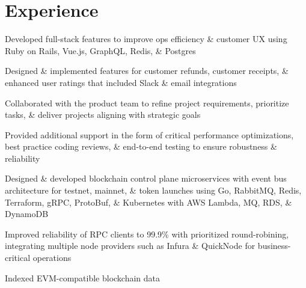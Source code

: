 \documentclass[]{resume}
\begin{document}
\begin{minipage}[t]{0.55\textwidth} 


\section{Experience}

\smallbreak
\smallbreak
\smallbreak
\begin{tightemize}
\item Developed full-stack features to improve ops efficiency \& customer UX using Ruby on Rails, Vue.js, GraphQL, Redis, \& Postgres
\item Designed \& implemented features for customer refunds, customer receipts, \& enhanced user ratings that included Slack \& email integrations
\item Collaborated with the product team to refine project requirements, prioritize tasks, \& deliver projects aligning with strategic goals
\item Provided additional support in the form of critical performance optimizations, best practice coding reviews, \& end-to-end testing to ensure robustness \& reliability
\end{tightemize}
\sectionsep 


\begin{tightemize}
\item Designed \& developed blockchain control plane microservices with event bus architecture for testnet, mainnet, \& token launches using Go, RabbitMQ, Redis, Terraform, gRPC, ProtoBuf, \& Kubernetes with AWS Lambda, MQ, RDS, \& DynamoDB
\item Improved reliability of RPC clients to 99.9\% with prioritized round-robining, integrating multiple node providers such as Infura \& QuickNode for business-critical operations
\item Indexed EVM-compatible blockchain data
\end{tightemize}
\sectionsep 


\end{minipage}
\end{document}

